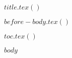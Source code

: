 \documentclass{book}
\begin{document}
$title.tex()$ 

$before-body.tex()$

$toc.tex()$

$body$
\end{document}
